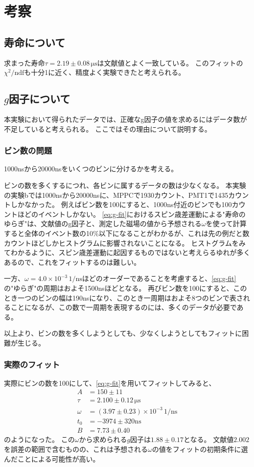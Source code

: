 \section{考察}
\subsection{寿命について}
求まった寿命$\tau= 2.19 \pm 0.08\,\mathrm{\mu s}$は文献値とよく一致している。
このフィットの$\chi^2 / \mathrm{ndf}$も十分1に近く、精度よく実験できたと考えられる。

\subsection{$g$因子について}
本実験において得られたデータでは、正確なg因子の値を求めるにはデータ数が不足していると考えられる。
ここではその理由について説明する。
\subsubsection{ビン数の問題}
1000nsから20000nsをいくつのビンに分けるかを考える。

ビンの数を多くするにつれ、各ビンに属するデータの数は少なくなる。
本実験の実験bでは1000nsから20000nsに、MPPCで1930カウント、PMT1で1435カウントしかなかった。
例えばビン数を100にすると、1000ns付近のビンでも100カウントほどのイベントしかない。
\ref{eq:g-fit}におけるスピン歳差運動による"寿命のゆらぎ"は、文献値のg因子と、測定した磁場の値から予想される$\omega$を使って計算すると全体のイベント数の10\%以下になることがわかるが、これは先の例だと数カウントほどしかヒストグラムに影響されないことになる。
ヒストグラムをみてわかるように、スピン歳差運動に起因するものではないと考えらるゆれが多くあるので、これをフィットするのは難しい。

一方、$\omega = 4.0 \times 10^{-3}\,\mathrm{1/ns}$ほどのオーダーであることを考慮すると、\ref{eq:g-fit}の"ゆらぎ"の周期はおよそ1500nsほどとなる。
再びビン数を100にすると、このとき一つのビンの幅は190nsになり、このとき一周期はおよそ8つのビンで表されることになるが、この数で一周期を表現するのには、多くのデータが必要である。

以上より、ビンの数を多くしようとしても、少なくしようとしてもフィットに困難が生じる。

\subsubsection{実際のフィット}
実際にビンの数を100にして、\ref{eq:g-fit}を用いてフィットしてみると、
\begin{align}
  A &= 150 \pm 11 \\
  \tau &= 2.100 \pm 0.12\,\mathrm{\mu s} \\
  \omega &= (3.97 \pm 0.23) \times 10^{-3}\,\mathrm{1/ns}\\
  t_0 &= -3974 \pm 320 \mathrm{ns} \\
  B &= 7.73 \pm 0.40
\end{align}
のようになった。
この$\omega$から求められる$g$因子は$1.88 \pm 0.17$となる。
文献値$2.002$を誤差の範囲で含むものの、これは予想される$\omega$の値をフィットの初期条件に選んだことによる可能性が高い。

